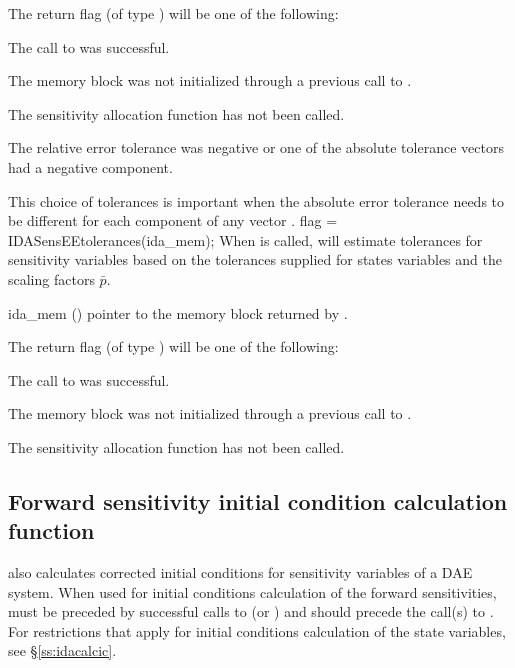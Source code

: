 {
  The return flag  (of type ) will be one of the following:
  \begin{args}
  \item[\Id{IDA\_SUCCESS}]
    The call to  was successful.
  \item[\Id{IDA\_MEM\_NULL}] 
    The {\idas} memory block was not initialized through a previous call to
    .
  \item[\Id{IDA\_NO\_SENS}] 
    The sensitivity allocation function  has not been called.
  \item[\Id{IDA\_ILL\_INPUT}] 
    The relative error tolerance was negative or one of the absolute tolerance
    vectors had a negative component.
  \end{args}
}
{
  This choice of tolerances is important when the absolute error tolerance needs to
  be different for each component of any vector . 
}
{
  flag = IDASensEEtolerances(ida\_mem);
}
{
  When  is called, {\idas} will estimate tolerances for
  sensitivity variables based on the tolerances supplied for states variables
  and the scaling factors $\bar p$.
}
{
  \begin{args}
  \item[ida\_mem] ()
    pointer to the {\idas} memory block returned by .
  \end{args}
}
{
  The return flag  (of type ) will be one of the following:
  \begin{args}
  \item[\Id{IDA\_SUCCESS}]
    The call to  was successful.
  \item[\Id{IDA\_MEM\_NULL}] 
    The {\idas} memory block was not initialized through a previous call to
    .
  \item[\Id{IDA\_NO\_SENS}] 
    The sensitivity allocation function  has not been called.
  \end{args}
}
{}


\subsection{Forward sensitivity initial condition calculation function}
\label{sss:idasenscalcic}

 also calculates corrected initial conditions for sensitivity
variables of a DAE system. When used for initial conditions calculation of the 
forward sensitivities,  must be preceded by successful calls to  
 (or ) and should precede the call(s) to 
.  For restrictions that apply for initial conditions
calculation of the state variables, see \S\ref{ss:idacalcic}.

